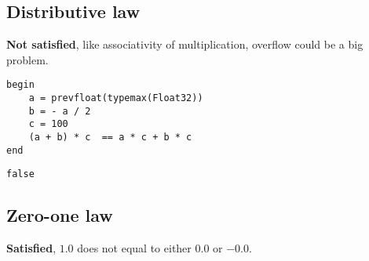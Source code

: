 \documentclass[11pt]{article}
\begin{document}
\subsection{Distributive law}
\label{sec:orgd896d53}
\textbf{Not satisfied}, like associativity of multiplication, overflow could be a big
problem.

\begin{verbatim}
begin
    a = prevfloat(typemax(Float32))
    b = - a / 2
    c = 100
    (a + b) * c  == a * c + b * c
end
\end{verbatim}

\begin{verbatim}
false
\end{verbatim}

\subsection{Zero-one law}
\label{sec:org7f2da8f}
\textbf{Satisfied}, \(1.0\) does not equal to either \(0.0\) or \(-0.0\).
\end{document}
